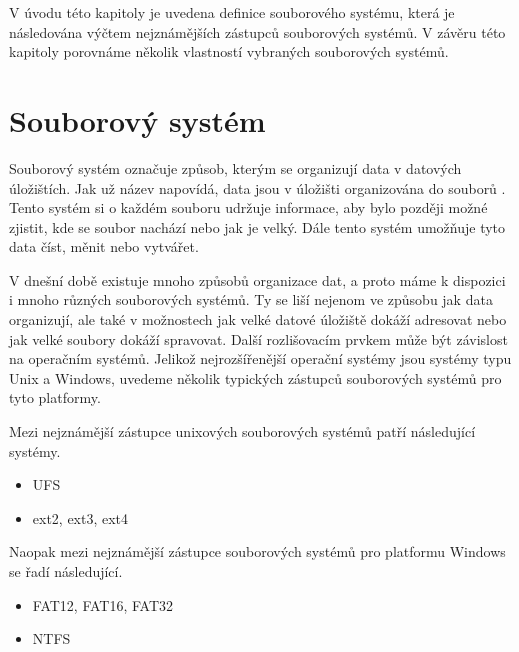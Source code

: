 V úvodu této kapitoly je uvedena definice souborového systému, která je následována výčtem nejznámějších zástupců souborových systémů. V závěru této kapitoly porovnáme několik vlastností vybraných souborových systémů.
\section{Souborový systém}
    \label{fs}
    Souborový systém označuje způsob, kterým se organizují data v datových úložištích. Jak už název napovídá, data jsou v úložišti organizována do souborů \cite{fs}.
    Tento systém si o každém souboru udržuje informace, aby bylo později možné zjistit, kde se soubor nachází nebo jak je velký. Dále tento systém umožňuje tyto data číst, měnit nebo vytvářet.

    V dnešní době existuje mnoho způsobů organizace dat, a proto máme k dispozici i mnoho různých souborových systémů. Ty se liší nejenom ve způsobu jak data organizují,
    ale také v možnostech jak velké datové úložiště dokáží adresovat nebo jak velké soubory dokáží spravovat. Další rozlišovacím prvkem může být závislost na operačním systémů.
    Jelikož nejrozšířenější operační systémy jsou systémy typu Unix a Windows, uvedeme několik typických zástupců souborových systémů pro tyto platformy.

    Mezi nejznámější zástupce unixových souborových systémů patří následující systémy.
    \begin{itemize}
      \item UFS
      \item ext2, ext3, ext4
    \end{itemize}

    Naopak mezi nejznámější zástupce souborových systémů pro platformu Windows se řadí následující.
    \begin{itemize}
      \item FAT12, FAT16, FAT32
      \item NTFS
    \end{itemize}

